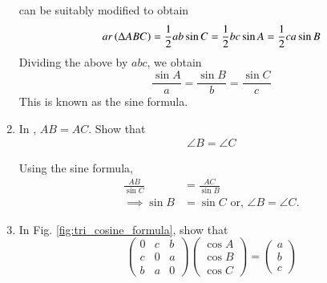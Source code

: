 \begin{enumerate}[label=\thesubsection.\arabic*.,ref=\thesubsection.\theenumi]
\solution 
{} can be suitably modified to obtain 
\begin{align}
ar\left(\Delta ABC\right) = 
\frac{1}{2}ab\sin C = \frac{1}{2}bc\sin A = \frac{1}{2}ca\sin B
	\label{tri:area-sin}
\end{align}
Dividing the above by $abc$, we obtain
	\begin{equation}
\label{eq:tri_sin_form}
	\frac{\sin A}{a} = \frac{\sin B}{b} = \frac{\sin C}{c}
	\end{equation}
This is known as the sine formula.	
%
\item 
	In , $AB = AC$.  Show that 
\begin{align}
	\angle B
	= \angle C 
\end{align}
\begin{figure}[H]
	\centering
		\resizebox{0.6\columnwidth}{!}{}
	\caption{}
	\label{fig:tri_isoc}
\end{figure}
\solution Using the sine formula, 
\begin{align}
	\frac{AB}{\sin C}
	&=\frac{AC}{\sin B}
	\\
	\implies \sin B &= \sin C
	\text{ or, } \angle B = \angle C.
\end{align}
\item
In Fig. \ref{fig:tri_cosine_formula}, show that
%
\begin{equation}
\label{eq:tri_cos_mat}
\begin{pmatrix}
0 & c & b \\
c & 0 & a \\
b & a & 0
\end{pmatrix}
\begin{pmatrix}
\cos A \\
\cos B \\
\cos C
\end{pmatrix}
= 
\begin{pmatrix}
a\\
b\\
c
\end{pmatrix}
\end{equation}
%
%
\begin{figure}[!ht]
	\begin{center}
		

\end{center}
\end{figure}
\end{enumerate}
